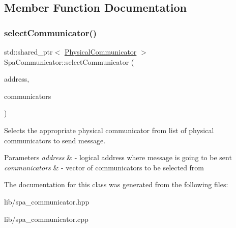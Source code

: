 \subsection{Member Function Documentation}
\mbox{\label{classSpaCommunicator_a063bb5ab2b09a46dbf296d151edae289}} 
\subsubsection{\texorpdfstring{select\+Communicator()}{selectCommunicator()}}
{\footnotesize\ttfamily std\+::shared\+\_\+ptr$<$ \hyperlink{classPhysicalCommunicator}{Physical\+Communicator} $>$ Spa\+Communicator\+::select\+Communicator (\begin{DoxyParamCaption}\item[{\hyperlink{structLogicalAddress}{Logical\+Address}}]{address,  }\item[{std\+::vector$<$ std\+::shared\+\_\+ptr$<$ \hyperlink{classPhysicalCommunicator}{Physical\+Communicator} $>$$>$ const \&}]{communicators }\end{DoxyParamCaption})\hspace{0.3cm}{\ttfamily [protected]}}

Selects the appropriate physical communicator from list of physical communicators to send message. 
\begin{DoxyParams}{Parameters}
{\em address} & -\/ logical address where message is going to be sent \\
\hline
{\em communicators} & -\/ vector of communicators to be selected from \\
\hline
\end{DoxyParams}


The documentation for this class was generated from the following files\+:\begin{DoxyCompactItemize}
\item 
lib/spa\+\_\+communicator.\+hpp\item 
lib/spa\+\_\+communicator.\+cpp\end{DoxyCompactItemize}
